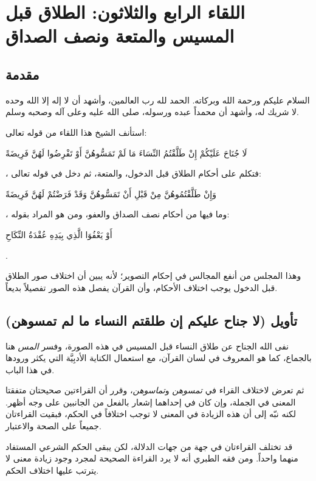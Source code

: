 \chapter{اللقاء الرابع والثلاثون: الطلاق قبل المسيس والمتعة ونصف الصداق}

\section{مقدمة}
السلام عليكم ورحمة الله وبركاته. الحمد لله رب العالمين، وأشهد أن لا إله إلا الله وحده لا شريك له، وأشهد أن محمداً عبده ورسوله، صلى الله عليه وعلى آله وصحبه وسلم.

استأنف الشيخ هذا اللقاء من قوله تعالى: \begin{ayah}لَا جُنَاحَ عَلَيْكُمْ إِنْ طَلَّقْتُمُ النِّسَاءَ مَا لَمْ تَمَسُّوهُنَّ أَوْ تَفْرِضُوا لَهُنَّ فَرِيضَةً\end{ayah}، فتكلم على أحكام الطلاق قبل الدخول، والمتعة، ثم دخل في قوله تعالى: \begin{ayah}وَإِنْ طَلَّقْتُمُوهُنَّ مِنْ قَبْلِ أَنْ تَمَسُّوهُنَّ وَقَدْ فَرَضْتُمْ لَهُنَّ فَرِيضَةً\end{ayah}، وما فيها من أحكام نصف الصداق والعفو، ومن هو المراد بقوله: \begin{ayah}أَوْ يَعْفُوَا الَّذِي بِيَدِهِ عُقْدَةُ النِّكَاحِ\end{ayah}.

وهذا المجلس من أنفع المجالس في إحكام التصوير؛ لأنه يبين أن اختلاف صور الطلاق قبل الدخول يوجب اختلاف الأحكام، وأن القرآن يفصل هذه الصور تفصيلاً بديعاً.

\separator

\section{تأويل (لا جناح عليكم إن طلقتم النساء ما لم تمسوهن)}
 نفى الله الجناح عن طلاق النساء قبل المسيس في هذه الصورة، وفسر  \textit{المس} هنا بالجماع، كما هو المعروف في لسان القرآن، مع استعمال الكناية الأدبِيَّة التي يكثر ورودها في هذا الباب.

ثم تعرض لاختلاف القراء في \textit{تمسوهن} و\textit{تماسوهن}، وقرر أن القراءتين صحيحتان متفقتا المعنى في الجملة، وإن كان في إحداهما إشعار بالفعل من الجانبين على وجه أظهر. لكنه نبّه إلى أن هذه الزيادة في المعنى لا توجب اختلافاً في الحكم، فبقيت القراءتان جميعاً على الصحة والاعتبار.

\begin{fawaid}
قد تختلف القراءتان في جهة من جهات الدلالة، لكن يبقى الحكم الشرعي المستفاد منهما واحداً. ومن فقه الطبري أنه لا يرد القراءة الصحيحة لمجرد وجود زيادة معنى لا يترتب عليها اختلاف الحكم.
\end{fawaid}

